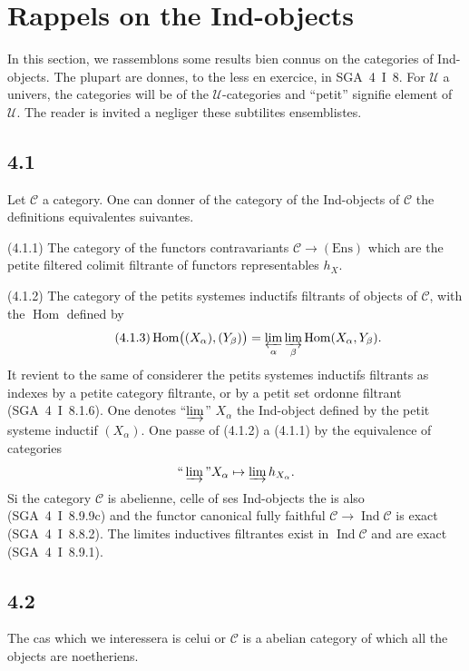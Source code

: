 \documentclass[12pt,a4paper]{article}
\theoremstyle{plain}
\theoremstyle{definition}
\theoremstyle{remark}
\DeclareMathOperator{\Hom}{Hom}
\DeclareMathOperator{\Ind}{Ind}
\begin{document}
\section{Rappels on the Ind-objects}
\label{sec:4}

In this section, we rassemblons some results bien connus on the categories of Ind-objects. The plupart are donnes, to the less en exercice, in SGA~4~I~8. For $\mathcal{U}$ a univers, the categories will be of the $\mathcal{U}$-categories and ``petit'' signifie element of $\mathcal{U}$. The reader is invited a negliger these subtilites ensemblistes.

\subsection*{4.1}

Let $\mathcal{C}$ a category. One can donner of the category of the Ind-objects of $\mathcal{C}$ the definitions equivalentes suivantes.

(4.1.1) The category of the functors contravariants $\mathcal{C}\to(\mathrm{Ens})$ which are the petite filtered colimit filtrante of functors representables $h_X$.

(4.1.2) The category of the petits systemes inductifs filtrants of objects of $\mathcal{C}$, with the $\Hom$ defined by
\begin{equation*}\tag{4.1.3}
\Hom\bigl((X_\alpha),(Y_\beta)\bigr) = 
\varprojlim_\alpha 
\varinjlim_\beta 
\Hom(X_\alpha, Y_\beta).
\end{equation*}
It revient to the same of considerer the petits systemes inductifs filtrants as indexes by a petite category filtrante, or by a petit set ordonne filtrant (SGA~4~I~8.1.6). One denotes ``$\varinjlim$'' $X_\alpha$ the Ind-object defined by the petit systeme inductif $(X_\alpha)$. One passe of (4.1.2) a (4.1.1) by the equivalence of categories
\[
\text{``}\varinjlim\text{''} X_\alpha 
\mapsto 
\varinjlim h_{X_\alpha}.
\]
Si the category $\mathcal{C}$ is abelienne, celle of ses Ind-objects the is also (SGA~4~I~8.9.9c) and the functor canonical fully faithful $\mathcal{C} 
\to 
\Ind\mathcal{C}$ is exact (SGA~4~I~8.8.2). The limites inductives filtrantes exist in $\Ind\mathcal{C}$ and are exact (SGA~4~I~8.9.1).

\subsection*{4.2}

The cas which we interessera is celui or $\mathcal{C}$ is a abelian category of which all the objects are noetheriens.
\end{document}
